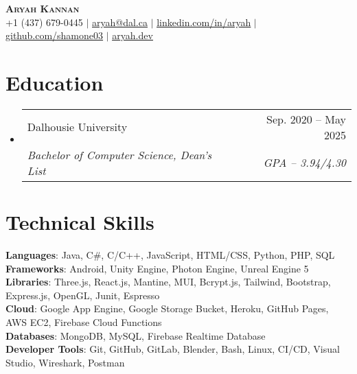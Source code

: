 \documentclass[letterpaper,11pt]{article}
\makeatletter
\newcommand{\resumeSubheading}[4]{
  \vspace{-2pt}\item
    \begin{tabular*}{0.97\textwidth}[t]{l@{\extracolsep{\fill}}r}
      #1 & #2 \\
      \textit{\small#3} & \textit{\small #4} \\
    \end{tabular*}\vspace{-7pt}
}
\newcommand{\resumeSubHeadingListStart}{\begin{itemize}[leftmargin=0.15in, label={}]}
\newcommand{\resumeSubHeadingListEnd}{\end{itemize}}
\makeatother
\begin{document}

\begin{center}
    \textbf{\Huge \scshape Aryah Kannan} \\ \vspace{1pt}
    \small +1 (437) 679-0445 $|$ \href{mailto:aryah@dal.ca}{\underline{aryah@dal.ca}} $|$ 
    \href{https://www.linkedin.com/in/aryahkannan/}{\underline{linkedin.com/in/aryah}} $|$
    \href{https://github.com/shamone03}{\underline{github.com/shamone03}} $|$
    \href{https://aryah.dev}{\underline{aryah.dev}}
\end{center}


\section{Education}
  \resumeSubHeadingListStart
    \resumeSubheading
      {Dalhousie University}{Sep. 2020 -- May 2025}
      {Bachelor of Computer Science, Dean's List}{GPA -- 3.94/4.30}
  \resumeSubHeadingListEnd
  
\section{Technical Skills}
 \begin{itemize}[leftmargin=0.15in, label={}]
    \small{\item{
     \textbf{Languages}{: Java, C\#, C/C++, JavaScript, HTML/CSS,  Python, PHP, SQL} \\
     \textbf{Frameworks}{: Android, Unity Engine, Photon Engine, Unreal Engine 5} \\
     \textbf{Libraries}{: Three.js, React.js, Mantine, MUI, Bcrypt.js, Tailwind, Bootstrap, Express.js, OpenGL, Junit, Espresso} \\
     \textbf{Cloud}{: Google App Engine, Google Storage Bucket, Heroku, GitHub Pages, AWS EC2, Firebase Cloud Functions} \\
     \textbf{Databases}{: MongoDB, MySQL, Firebase Realtime Database} \\
     \textbf{Developer Tools}{: Git, GitHub, GitLab, Blender, Bash, Linux, CI/CD, Visual Studio, Wireshark, Postman} \\
     
    }}
 \end{itemize}
\end{document}
